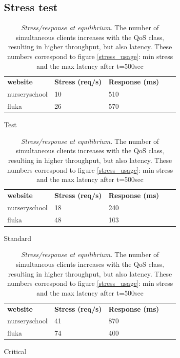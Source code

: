 
\subsection{Stress test}

\begin{table}
    \centering
    \begin{subtable}{0.49\textwidth}
        \begin{tabular}{|l|ll|ll}
        \cline{1-3}
        \textbf{website} & \multicolumn{1}{l|}{\textbf{Stress (req/s)}} & \textbf{Response (ms)} &  &  \\ \cline{1-3}
        nurseryschool    & 10                                           & 510                    &  &  \\ \cline{1-1}
        fluka            & 26                                           & 570                    &  &  \\ \cline{1-3}
        \end{tabular}
    \caption{Test}
    \end{subtable}
    \begin{subtable}{0.49\textwidth}
        \begin{tabular}{|l|ll|ll}
        \cline{1-3}
        \textbf{website} & \multicolumn{1}{l|}{\textbf{Stress (req/s)}} & \textbf{Response (ms)} &  &  \\ \cline{1-3}
        nurseryschool    & 18                                           & 240                    &  &  \\ \cline{1-1}
        fluka            & 48                                           & 103                    &  &  \\ \cline{1-3}
        \end{tabular}
    \caption{Standard}
    \end{subtable}
    \begin{subtable}{0.49\textwidth}
        \begin{tabular}{|l|ll|ll}
        \cline{1-3}
        \textbf{website} & \multicolumn{1}{l|}{\textbf{Stress (req/s)}} & \textbf{Response (ms)} &  &  \\ \cline{1-3}
        nurseryschool    & 41  & 870   &  &  \\ \cline{1-1}
        fluka            & 74  & 400   &  &  \\ \cline{1-3}
        \end{tabular}
    \caption{Critical}
    \end{subtable}
    \vspace{-1.5em}
    \caption{\emph{Stress/response at equilibrium}. The number of simultaneous clients increases with the QoS class, resulting in higher throughput, but also latency. These numbers correspond to figure \ref{stress_usage}: min stress and the max latency after t=500sec}
    \vspace{-3.2em}
    \label{tab:stress-response}
\end{table}

